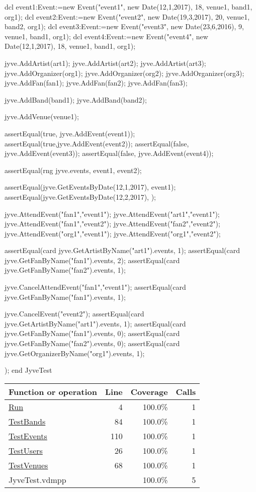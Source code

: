 \begin{vdmpp}[breaklines=true]
  dcl event1:Event:=new Event("event1", new Date(12,1,2017), 18, venue1, band1, org1);
  dcl event2:Event:=new Event("event2", new Date(19,3,2017), 20, venue1, band2, org1);
  dcl event3:Event:=new Event("event3", new Date(23,6,2016), 9, venue1, band1, org1);
  dcl event4:Event:=new Event("event4", new Date(12,1,2017), 18, venue1, band1, org1);
  
  jyve.AddArtist(art1);
  jyve.AddArtist(art2);
  jyve.AddArtist(art3);
  jyve.AddOrganizer(org1);
  jyve.AddOrganizer(org2);
  jyve.AddOrganizer(org3);
  jyve.AddFan(fan1);
  jyve.AddFan(fan2);
  jyve.AddFan(fan3);
  
  jyve.AddBand(band1);
  jyve.AddBand(band2);
  
  jyve.AddVenue(venue1);
  
  assertEqual(true, jyve.AddEvent(event1));
  assertEqual(true,jyve.AddEvent(event2));
  assertEqual(false, jyve.AddEvent(event3));
  assertEqual(false, jyve.AddEvent(event4));
  
  assertEqual(rng jyve.events, {event1, event2});
  
  assertEqual(jyve.GetEventsByDate(12,1,2017), {event1});
  assertEqual(jyve.GetEventsByDate(12,2,2017), {});
  
  jyve.AttendEvent("fan1","event1");
  jyve.AttendEvent("art1","event1");
  jyve.AttendEvent("fan1","event2");
  jyve.AttendEvent("fan2","event2");
  jyve.AttendEvent("org1","event1");
  jyve.AttendEvent("org1","event2");
  
  assertEqual(card jyve.GetArtistByName("art1").events, 1);
  assertEqual(card jyve.GetFanByName("fan1").events, 2);
  assertEqual(card jyve.GetFanByName("fan2").events, 1);
  
  jyve.CancelAttendEvent("fan1","event1");
  assertEqual(card jyve.GetFanByName("fan1").events, 1);
  
  jyve.CancelEvent("event2");
  assertEqual(card jyve.GetArtistByName("art1").events, 1);
  assertEqual(card jyve.GetFanByName("fan1").events, 0);
  assertEqual(card jyve.GetFanByName("fan2").events, 0);
  assertEqual(card jyve.GetOrganizerByName("org1").events, 1);
  
  
 );
end JyveTest
\end{vdmpp}
\bigskip
\begin{longtable}{|l|r|r|r|}
\hline
Function or operation & Line & Coverage & Calls \\
\hline
\hline
\hyperref[Run:4]{Run} & 4&100.0\% & 1 \\
\hline
\hyperref[TestBands:84]{TestBands} & 84&100.0\% & 1 \\
\hline
\hyperref[TestEvents:110]{TestEvents} & 110&100.0\% & 1 \\
\hline
\hyperref[TestUsers:26]{TestUsers} & 26&100.0\% & 1 \\
\hline
\hyperref[TestVenues:68]{TestVenues} & 68&100.0\% & 1 \\
\hline
\hline
JyveTest.vdmpp & & 100.0\% & 5 \\
\hline
\end{longtable}

